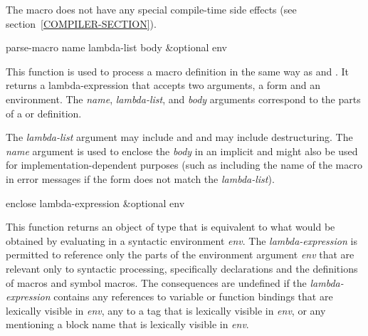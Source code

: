 \begin{newer}
\begin{defmac}
  The  macro does not have any special compile-time
  side effects (see section~\ref{COMPILER-SECTION}).
\end{defmac}

\begin{defun}[Function]
parse-macro name lambda-list body &optional env

  This function is used to process a macro definition in the same way
  as  and .  It returns a lambda-expression that accepts
  two arguments, a form and an environment.  The {\it name}, {\it lambda-list},
  and {\it body} arguments correspond to the parts of a  or 
  definition.

  The {\it lambda-list} argument may include  and 
  and may include destructuring.
  The {\it name}
  argument is used to enclose the {\it body} in an implicit  and might also
  be used for implementation-dependent purposes (such as including the name of
  the macro in error messages if the form does not match the {\it lambda-list}).
\end{defun}

\begin{defun}[Function]
enclose lambda-expression &optional env

  This function returns an object of type  that is equivalent to what
  would be obtained by evaluating 
  in a syntactic
  environment {\it env}.  The {\it lambda-expression} is permitted to reference only the
  parts of the environment argument {\it env} that are relevant only to syntactic
  processing, specifically declarations and the definitions of macros and
  symbol macros.  The consequences are undefined if the {\it lambda-expression}
  contains any references to variable or function bindings that are 
  lexically visible in {\it env}, any  to a tag that is lexically visible in 
  {\it env}, or any  mentioning a block name that is lexically 
  visible in {\it env}.
\end{defun}  
\end{newer}
